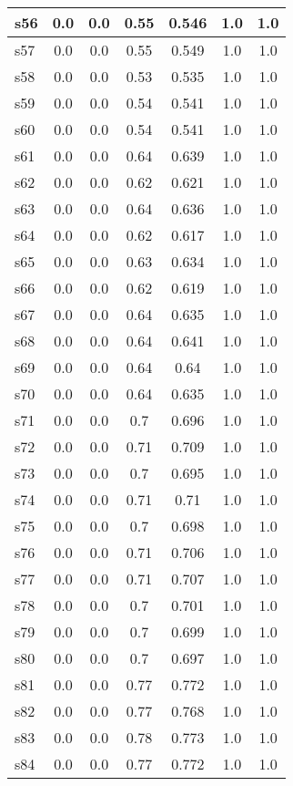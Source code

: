 \documentclass{article}
\begin{document}
\begin{tabular}{|l|c|c|c|c|c|c|}
\hline
s56 &0.0 & 0.0 & 0.55 & 0.546 & 1.0 & 1.0\\
\hline
s57 &0.0 & 0.0 & 0.55 & 0.549 & 1.0 & 1.0\\
\hline
s58 &0.0 & 0.0 & 0.53 & 0.535 & 1.0 & 1.0\\
\hline
s59 &0.0 & 0.0 & 0.54 & 0.541 & 1.0 & 1.0\\
\hline
s60 &0.0 & 0.0 & 0.54 & 0.541 & 1.0 & 1.0\\
\hline
s61 &0.0 & 0.0 & 0.64 & 0.639 & 1.0 & 1.0\\
\hline
s62 &0.0 & 0.0 & 0.62 & 0.621 & 1.0 & 1.0\\
\hline
s63 &0.0 & 0.0 & 0.64 & 0.636 & 1.0 & 1.0\\
\hline
s64 &0.0 & 0.0 & 0.62 & 0.617 & 1.0 & 1.0\\
\hline
s65 &0.0 & 0.0 & 0.63 & 0.634 & 1.0 & 1.0\\
\hline
s66 &0.0 & 0.0 & 0.62 & 0.619 & 1.0 & 1.0\\
\hline
s67 &0.0 & 0.0 & 0.64 & 0.635 & 1.0 & 1.0\\
\hline
s68 &0.0 & 0.0 & 0.64 & 0.641 & 1.0 & 1.0\\
\hline
s69 &0.0 & 0.0 & 0.64 & 0.64 & 1.0 & 1.0\\
\hline
s70 &0.0 & 0.0 & 0.64 & 0.635 & 1.0 & 1.0\\
\hline
s71 &0.0 & 0.0 & 0.7 & 0.696 & 1.0 & 1.0\\
\hline
s72 &0.0 & 0.0 & 0.71 & 0.709 & 1.0 & 1.0\\
\hline
s73 &0.0 & 0.0 & 0.7 & 0.695 & 1.0 & 1.0\\
\hline
s74 &0.0 & 0.0 & 0.71 & 0.71 & 1.0 & 1.0\\
\hline
s75 &0.0 & 0.0 & 0.7 & 0.698 & 1.0 & 1.0\\
\hline
s76 &0.0 & 0.0 & 0.71 & 0.706 & 1.0 & 1.0\\
\hline
s77 &0.0 & 0.0 & 0.71 & 0.707 & 1.0 & 1.0\\
\hline
s78 &0.0 & 0.0 & 0.7 & 0.701 & 1.0 & 1.0\\
\hline
s79 &0.0 & 0.0 & 0.7 & 0.699 & 1.0 & 1.0\\
\hline
s80 &0.0 & 0.0 & 0.7 & 0.697 & 1.0 & 1.0\\
\hline
s81 &0.0 & 0.0 & 0.77 & 0.772 & 1.0 & 1.0\\
\hline
s82 &0.0 & 0.0 & 0.77 & 0.768 & 1.0 & 1.0\\
\hline
s83 &0.0 & 0.0 & 0.78 & 0.773 & 1.0 & 1.0\\
\hline
s84 &0.0 & 0.0 & 0.77 & 0.772 & 1.0 & 1.0\\

\end{tabular}
\end{document}
